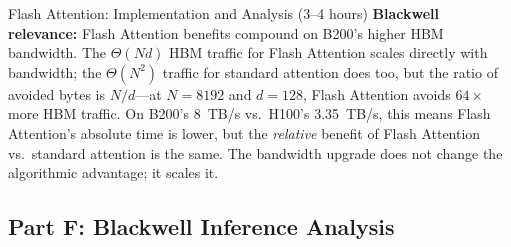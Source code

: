 \begin{exercise}{Flash Attention: Implementation and Analysis (3--4 hours)}
\textbf{Blackwell relevance:} Flash Attention benefits compound on B200's higher HBM bandwidth. The $\Theta(Nd)$ HBM traffic for Flash Attention scales directly with bandwidth; the $\Theta(N^2)$ traffic for standard attention does too, but the ratio of avoided bytes is $N/d$---at $N=8192$ and $d=128$, Flash Attention avoids $64\times$ more HBM traffic. On B200's 8~TB/s vs.\ H100's 3.35~TB/s, this means Flash Attention's absolute time is lower, but the \textit{relative} benefit of Flash Attention vs.\ standard attention is the same. The bandwidth upgrade does not change the algorithmic advantage; it scales it.
\end{exercise}

\subsection{Part F: Blackwell Inference Analysis}

